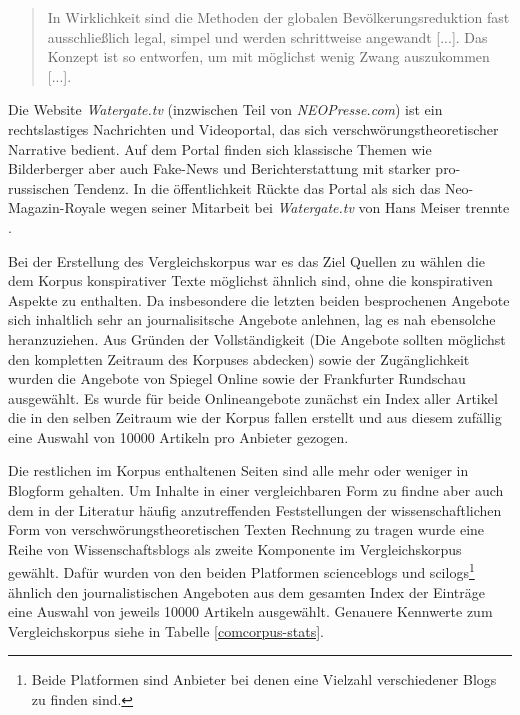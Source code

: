 \begin{quotation}
    In Wirklichkeit sind die Methoden der globalen Bevölkerungsreduktion fast ausschließlich legal, simpel und werden schrittweise angewandt [...]. Das Konzept ist so entworfen, um mit möglichst wenig Zwang auszukommen [...]. \parencite{recentr-population}
\end{quotation} 

Die Website \textit{Watergate.tv} (inzwischen Teil von \textit{NEOPresse.com}) ist ein rechtslastiges Nachrichten und Videoportal, das sich verschwörungstheoretischer Narrative bedient. 
Auf dem Portal finden sich klassische Themen wie Bilderberger \parencite[vgl.][]{watergate-bilderberger} aber auch Fake-News und Berichterstattung mit starker pro-russischen Tendenz.
In die öffentlichkeit Rückte das Portal als sich das Neo-Magazin-Royale wegen seiner Mitarbeit bei \textit{Watergate.tv} von Hans Meiser trennte \parencite*[Siehe z.B.][]{spiegel-watergate}.



Bei der Erstellung des Vergleichskorpus war es das Ziel Quellen zu wählen die dem Korpus konspirativer Texte möglichst ähnlich sind, ohne die konspirativen Aspekte zu enthalten.
Da insbesondere die letzten beiden besprochenen Angebote sich inhaltlich sehr an journalisitsche Angebote anlehnen, lag es nah ebensolche heranzuziehen.
Aus Gründen der Vollständigkeit (Die Angebote sollten möglichst den kompletten Zeitraum des Korpuses abdecken) sowie der Zugänglichkeit wurden die Angebote von Spiegel Online sowie der Frankfurter Rundschau ausgewählt.
Es wurde für beide Onlineangebote zunächst ein Index aller Artikel die in den selben Zeitraum wie der Korpus fallen erstellt und aus diesem zufällig eine Auswahl von 10000 Artikeln pro Anbieter gezogen.

Die restlichen im Korpus enthaltenen Seiten sind alle mehr oder weniger in Blogform gehalten.
Um Inhalte in einer vergleichbaren Form zu findne aber auch dem in der Literatur häufig anzutreffenden Feststellungen der wissenschaftlichen Form von verschwörungstheoretischen Texten Rechnung zu tragen wurde eine Reihe von Wissenschaftsblogs als zweite Komponente im Vergleichskorpus gewählt.
Dafür wurden von den beiden Platformen scienceblogs und scilogs\footnote{Beide Platformen sind Anbieter bei denen eine Vielzahl verschiedener Blogs zu finden sind.} ähnlich den journalistischen Angeboten aus dem gesamten Index der Einträge eine Auswahl von jeweils 10000 Artikeln ausgewählt.
Genauere Kennwerte zum Vergleichskorpus siehe in Tabelle \ref{comcorpus-stats}.

